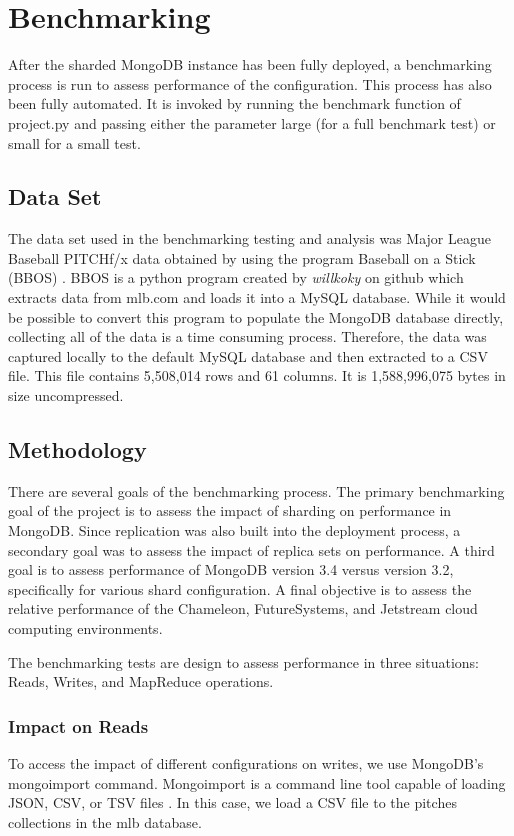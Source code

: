 \documentclass[9pt,twocolumn,twoside]{../../styles/osajnl}
\begin{document}
\section{Benchmarking}

After the sharded MongoDB instance has been fully deployed, a benchmarking process is run to assess performance of the configuration.  This process has also been fully automated.  It is invoked by running the benchmark function of project.py and passing either the parameter large (for a full benchmark test) or small for a small test.

\subsection{Data Set}

The data set used in the benchmarking testing and analysis was Major League Baseball PITCHf/x data obtained by using the program Baseball on a Stick (BBOS)  \cite{www-bbos}.  BBOS is a python program created by \emph{willkoky} on github which extracts data from mlb.com and loads it into a MySQL database.  While it would be possible to convert this program to populate the MongoDB database directly, collecting all of the data is a time consuming process. Therefore, the data was captured locally to the default MySQL database and then extracted to a CSV file.  This file contains 5,508,014 rows and 61 columns.  It is 1,588,996,075 bytes in size uncompressed.


\subsection{Methodology}

There are several goals of the benchmarking process.  The primary benchmarking goal of the project is to assess the impact of sharding on performance in MongoDB.  Since replication was also built into the deployment process, a secondary goal was to assess the impact of replica sets on performance.  A third goal is to assess performance of MongoDB version 3.4 versus version 3.2, specifically for various shard configuration.  A final objective is to assess the relative performance of the Chameleon, FutureSystems, and Jetstream cloud computing environments.

The benchmarking tests are design to assess performance in three situations: Reads, Writes, and MapReduce operations.



\subsubsection{Impact on Reads}
To access the impact of different configurations on writes, we use MongoDB's mongoimport command.  Mongoimport is a command line tool capable of loading JSON, CSV, or TSV files \cite{www-mongoimport}. In this case, we load a CSV file to the pitches collections in the mlb database.
\end{document}
